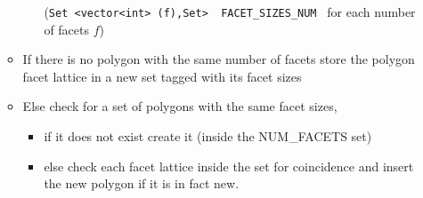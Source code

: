 \documentclass[11pt]{amsart}
\begin{document}
\begin{enumerate}
\begin{itemize}
\begin{itemize}
  (\verb+Set <vector<int> (f),Set>  FACET_SIZES_NUM + for each number of facets $f$) 
 \end{itemize}
 \item If there is no polygon with the same number of facets store the polygon facet lattice in a new set tagged with its facet sizes
 \item Else check for a set of polygons with the same facet sizes,
  \begin{itemize}
   \item if it does not exist create it (inside the NUM\_FACETS set)
   \item else check each facet lattice inside the set for coincidence and insert the new polygon if it is in fact new.
  \end{itemize}
\end{itemize}


\end{enumerate}
\end{document}
